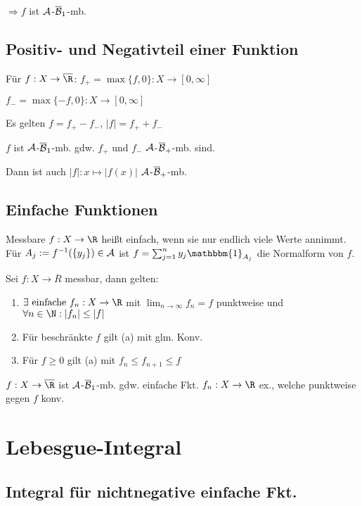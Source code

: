 $\Rightarrow f$ ist $\mathcal{A}$-$\overline{\mathcal{B}}_1$-mb.

\subsection*{Positiv- und Negativteil einer Funktion}

Für $f : X \to \overline \R$: $f_+ = \max\{f,0\} : X \to [0, \infty]$

\hspace{20.1mm} $f_- = \max\{-f,0\} : X \to [0, \infty]$

Es gelten $f = f_+ - f_-$, $|f| = f_+ + f_-$

$f$ ist $\mathcal{A}$-$\overline{\mathcal{B}}_1$-mb. gdw. $f_+$ und $f_-$ $\mathcal{A}$-$\overline{\mathcal{B}}_+$-mb. sind.

Dann ist auch $|f| : x \mapsto |f(x)|$ $\mathcal{A}$-$\overline{\mathcal{B}}_+$-mb.

\subsection*{Einfache Funktionen}

Messbare $f : X \to \R$ heißt einfach, wenn sie nur endlich viele Werte annimmt. Für $A_j := f^{-1}(\{y_j\}) \in \mathcal{A}$ ist $f = \sum_{j=1}^n y_j \mathbbm{1}_{A_j}$  die Normalform von $f$.

Sei $f : X \to \overline R$ messbar, dann gelten:

\begin{enumerate}[label=(\alph*)]
	\item $\exists \text{ einfache } f_n : X \to \R$ mit $\lim_{n \to \infty} f_n = f$ punktweise und $\forall n \in \N : |f_n| \leq |f|$
	\item Für beschränkte $f$ gilt (a) mit glm. Konv.
	\item Für $f \geq 0$ gilt (a) mit $f_n \leq f_{n+1} \leq f$
\end{enumerate}

$f : X \to \overline\R$ ist $\mathcal{A}$-$\overline{\mathcal{B}}_1$-mb. gdw. einfache Fkt. $f_n : X \to \R$ ex., welche punktweise gegen $f$ konv.

\section*{Lebesgue-Integral}

\subsection*{Integral für nichtnegative einfache Fkt.}

